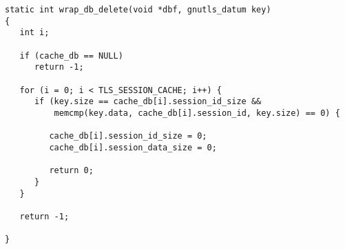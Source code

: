 \begin{verbatim}
static int wrap_db_delete(void *dbf, gnutls_datum key)
{
   int i;

   if (cache_db == NULL)
      return -1;

   for (i = 0; i < TLS_SESSION_CACHE; i++) {
      if (key.size == cache_db[i].session_id_size &&
          memcmp(key.data, cache_db[i].session_id, key.size) == 0) {

         cache_db[i].session_id_size = 0;
         cache_db[i].session_data_size = 0;

         return 0;
      }
   }

   return -1;

}

\end{verbatim}
